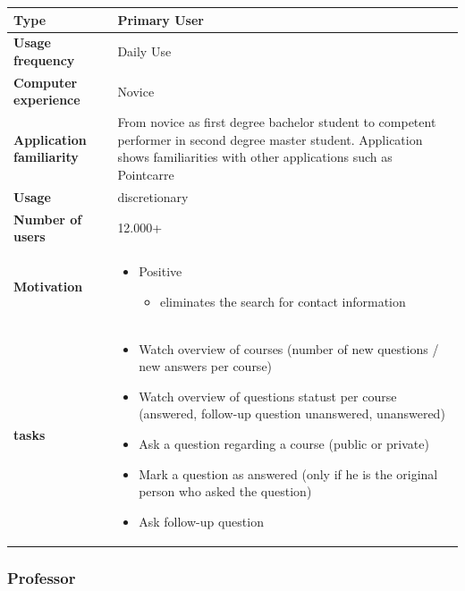 \documentclass[10pt]{report}
\begin{document}
\begin{tabular}{ | l | p{10cm} |}
\hline
\textbf{Type} & Primary User \\ \hline
\textbf{Usage frequency} & Daily Use \\ \hline
\textbf{Computer experience} & Novice \\ \hline
\textbf{Application familiarity} & From novice as first degree bachelor student to competent performer in second degree master student. Application shows familiarities with other applications such as Pointcarre\\ \hline
\textbf{Usage} & discretionary\\ \hline
\textbf{Number of users} & 12.000+\\ \hline
\textbf{Motivation} & 
	\begin{itemize}
		\item Positive 
		\begin{itemize}
			\item eliminates the search for contact information
		\end{itemize}
	\end{itemize} \\ \hline
\textbf{tasks} & 
	\begin{itemize}
		\item Watch overview of courses (number of new questions / new answers per course)
		\item Watch overview of questions statust per course (answered, follow-up question unanswered, unanswered)
		\item Ask a question regarding a course (public or private)
		\item Mark a question as answered (only if he is the original person who asked the question)
		\item Ask follow-up question
	\end{itemize} \\ \hline
\end{tabular}

\subsubsection{Professor}
\end{document}
